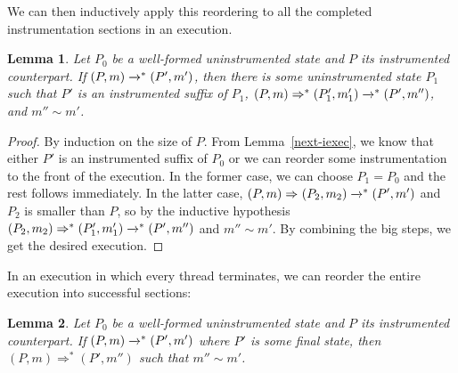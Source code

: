 \documentclass[preprint, 10pt]{sigplanconf}
\newcommand{\ignore}[1]{}
\newcommand{\cfg}[2]{\ensuremath{(#1, #2)}}
\newcommand{\execstar}[4]{\ensuremath{\cfg{#1}{#2} \tto{#3} #4}}
\newcommand{\iexec}[4]{\ensuremath{\cfg{#1}{#2} \Rightarrow_{#3} #4}}
\newcommand{\execstars}[2]{\ensuremath{ \tto{#1} #2}}
\newcommand{\iexecstar}[3]{\ensuremath{(#1, #2) \Rightarrow^{*} #3}}
\newcommand{\tto}[1]{\mathrel{
  \vphantom{\xrightarrow{#1}}
  \smash{\xrightarrow{#1}}
  \vphantom{\to}^{*}}
}
\newtheorem{lemma}{Lemma}
\begin{document}
{We can then inductively apply this reordering to all the completed instrumentation sections in an execution.
\begin{lemma}\label{exec-iexec1}Let $P_0$ be a well-formed uninstrumented state and $P$ its instrumented counterpart. If $\execstar{P}{m}{}{(P', m')}$, then there is some uninstrumented state $P_1$ such that $P'$ is an instrumented suffix of $P_1$, $\iexecstar{P}{m}{(P_1', m_1')} \execstars{}{(P', m'')}$, and $m'' \sim m'$.\end{lemma}
\begin{proof}By induction on the size of $P$. From Lemma~\ref{next-iexec}, we know that either $P'$ is an instrumented suffix of $P_0$ or we can reorder some instrumentation to the front of the execution. In the former case, we can choose $P_1 = P_0$ and the rest follows immediately. In the latter case, $\iexec{P}{m}{}{(P_2, m_2)} \execstars{}{(P', m')}$ and $P_2$ is smaller than $P$, so by the inductive hypothesis $\iexecstar{P_2}{m_2}{(P_1', m_1')} \execstars{}{(P', m'')}$ and $m'' \sim m'$. By combining the big steps, we get the desired execution.\end{proof}
}
In an execution in which every thread terminates, we can reorder the entire execution into successful sections:
\begin{lemma}\label{exec-iexec}Let $P_0$ be a well-formed uninstrumented state and $P$ its instrumented counterpart. If $\execstar{P}{m}{}{(P', m')}$ where $P'$ is some final state, then $\iexecstar{P}{m}{(P', m'')}$ such that $m'' \sim m'$.\end{lemma}
\ignore{\begin{proof}By Lemma~\ref{exec-iexec1}, there is some $P_1$ such that $\iexecstar{P}{m}{(P_1', m_1')} \execstars{}{(P', m'')}$ and $P'$ is an instrumented suffix of $P_1$. But a final state is only the instrumented suffix of a final state, and so $P_1$ and hence $P_1'$ must also be final. Since $P_1'$ is final, $P_1' = P'$ and $m_1' = m''$, completing the proof.\end{proof}}
\end{document}
